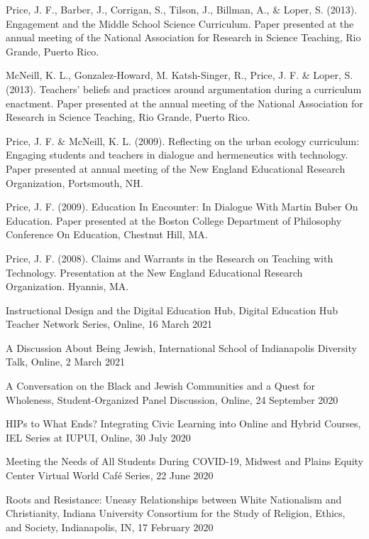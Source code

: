 \documentclass[11pt,article,oneside]{memoir}
\begin{document}
\ind Price, J. F., Barber, J., Corrigan, S., Tilson, J., Billman, A., \& Loper, S. (2013). Engagement and the Middle School Science Curriculum. Paper presented at the annual meeting of the National Association for Research in Science Teaching, Rio Grande, Puerto Rico. 

\ind McNeill, K. L., Gonzalez-Howard, M. Katsh-Singer, R., Price, J. F. \& Loper, S. (2013). Teachers’ beliefs and practices around argumentation during a curriculum enactment. Paper presented at the annual meeting of the National Association for Research in Science Teaching, Rio Grande, Puerto Rico.

\ind Price, J. F. \& McNeill, K. L. (2009). Reflecting on the urban ecology curriculum: Engaging students and teachers in dialogue and hermeneutics with technology. Paper presented at annual meeting of the New England Educational Research Organization, Portsmouth, NH. 

\ind Price, J. F. (2009). Education In Encounter: In Dialogue With Martin Buber On Education. Paper presented at the Boston College Department of Philosophy Conference On Education, Chestnut Hill, MA. 

\ind Price, J. F. (2008). Claims and Warrants in the Research on Teaching with Technology. Presentation at the New England Educational Research Organization. Hyannis, MA.

\newpage



\ind Instructional Design and the Digital Education Hub, Digital Education Hub Teacher Network Series, Online, 16 March 2021

\ind A Discussion About Being Jewish, International School of Indianapolis Diversity Talk, Online, 2 March 2021

\ind A Conversation on the Black and Jewish Communities and a Quest for Wholeness, Student-Organized Panel Discussion, Online, 24 September 2020

\ind HIPs to What Ends? Integrating Civic Learning into Online and Hybrid Courses, IEL Series at IUPUI, Online, 30 July 2020

\ind Meeting the Needs of All Students During COVID-19, Midwest and Plains Equity Center Virtual World Café Series, 22 June 2020

\ind Roots and Resistance: Uneasy Relationships between White Nationalism and Christianity, Indiana University Consortium for the Study of Religion, Ethics, and Society, Indianapolis, IN, 17 February 2020
\end{document}
